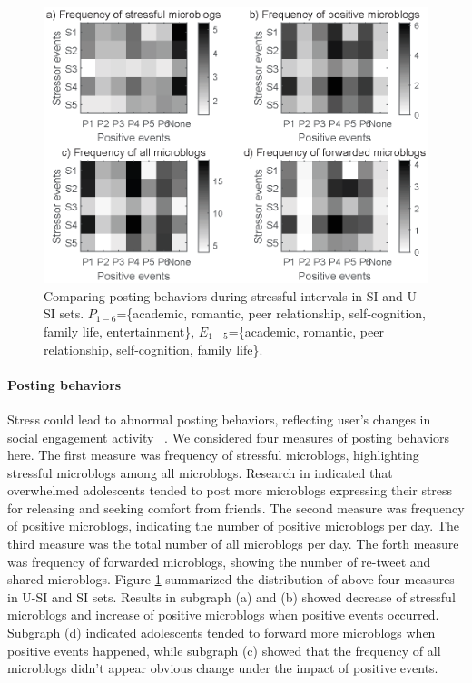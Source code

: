 \begin{figure}[h]
\centering
\includegraphics[width=\linewidth]{figs/gray/post.eps}
\caption{\small{Comparing posting behaviors during stressful intervals in SI and U-SI sets.
$P_{1-6}$=\{academic, romantic, peer relationship, self-cognition, family life, entertainment\},
$E_{1-5}$=\{academic, romantic, peer relationship, self-cognition, family life\}.}}
\label{fig:post}
\end{figure}

\paragraph{\textbf{Posting behaviors}}
Stress could lead to abnormal posting behaviors,
reflecting user's changes in social engagement activity ~\citep{Liang2015Teenagers}.
We considered four measures of posting behaviors here.
The first measure was frequency of stressful microblogs,
highlighting stressful microblogs among all microblogs.
Research in \cite{Li2017Analyzing} indicated that overwhelmed adolescents
tended to post more microblogs expressing their stress for releasing and seeking comfort from friends.
The second measure was frequency of positive microblogs,
indicating the number of positive microblogs per day.
The third measure was the total number of all microblogs per day.
The forth measure was frequency of forwarded microblogs,
showing the number of re-tweet and shared microblogs.
Figure \ref{fig:post} summarized the distribution of above four measures in U-SI and SI sets.
Results in subgraph (a) and (b) showed decrease of stressful microblogs and
increase of positive microblogs when positive events occurred.
Subgraph (d) indicated adolescents tended to forward more microblogs when positive events happened,
while subgraph (c) showed that the frequency of all microblogs didn't appear obvious change under the impact of positive events.

